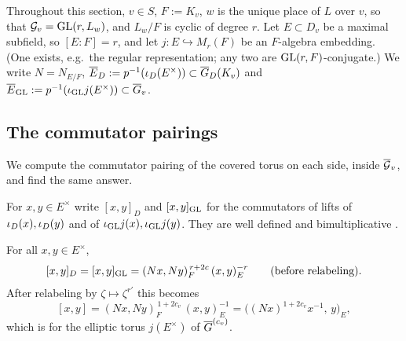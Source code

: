 Throughout this section, $v\in S$, $F:=K_v$, $w$ is the unique place of $L$ over $v$, so that $\mathcal{G}_v=\mathrm{GL}(r,L_w)$, and $L_w/F$ is cyclic of degree $r$. Let $E\subset D_v$ be a maximal subfield, so $[E:F]=r$, and let $j:E\hookrightarrow M_r(F)$ be an $F$-algebra embedding. (One exists, e.g.\ the regular representation; any two are $\mathrm{GL}(r,F)$-conjugate.) We write $N=N_{E/F}$, $\overline{E}_D:=p^{-1}(\iota_D(E^\times))\subset\overline{G}_D(K_v)$ and $\overline{E}_{\mathrm{GL}}:=p^{-1}(\iota_{\mathrm{GL}} j(E^\times))\subset\overline{G}_v$.

\subsection{The commutator pairings}\label{I:subsec:comm}
We compute the commutator pairing of the covered torus on each side, inside $\overline{\mathcal{G}}_v$, and find the same answer.

For $x,y\in E^\times$ write $[x,y]_D$ and $[x,y]_{\mathrm{GL}}$ for the commutators of lifts of $\iota_D(x),\iota_D(y)$ and of $\iota_{\mathrm{GL}} j(x),\iota_{\mathrm{GL}} j(y)$. They are well defined and bimultiplicative \cite[\S3]{FK86}.

\begin{proposition}\label{I:prop:comm}
For all $x,y\in E^\times$,
\begin{equation}\label{I:eq:commboth}
[x,y]_D=[x,y]_{\mathrm{GL}}=(Nx,Ny)_F^{\,r+2c}\,(x,y)_E^{-r}\qquad\text{(before relabeling)}.
\end{equation}
After relabeling by $\zeta\mapsto\zeta^{r'}$ this becomes
\begin{equation}\label{I:eq:commrelab}
[x,y]=(Nx,Ny)_F^{\,1+2c_v}\,(x,y)_E^{-1}=\big((Nx)^{1+2c_v}x^{-1},\,y\big)_E,
\end{equation}
which is \cite[equation~(2)]{JC26a} for the elliptic torus $j(E^\times)$ of $\overline{G}^{(c_v)}$.
\end{proposition}

